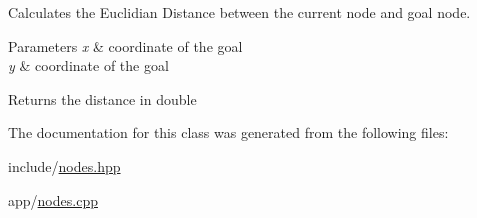 Calculates the Euclidian Distance between the current node and goal node. 


\begin{DoxyParams}{Parameters}
{\em x} & coordinate of the goal \\
\hline
{\em y} & coordinate of the goal\\
\hline
\end{DoxyParams}
\begin{DoxyReturn}{Returns}
the distance in double 
\end{DoxyReturn}


The documentation for this class was generated from the following files\+:\begin{DoxyCompactItemize}
\item 
include/\hyperlink{nodes_8hpp}{nodes.\+hpp}\item 
app/\hyperlink{nodes_8cpp}{nodes.\+cpp}\end{DoxyCompactItemize}
